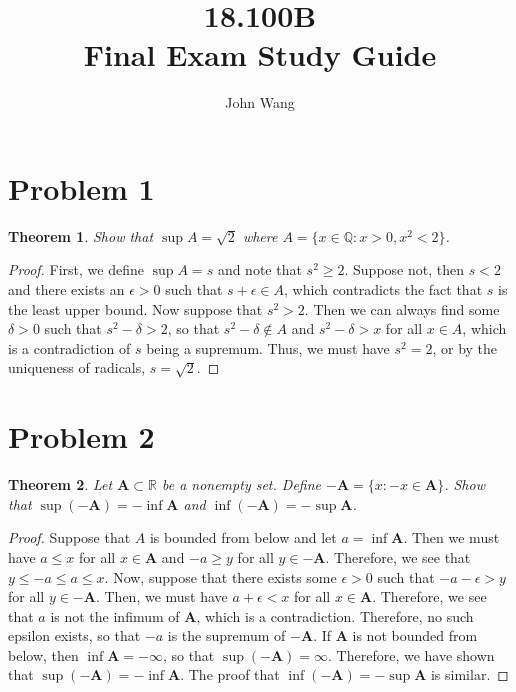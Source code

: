 \documentclass[psamsfonts]{amsart}
\title{18.100B \\
Final Exam Study Guide }
\author{John Wang}
\newtheorem{thm}{Theorem}[section]
\theoremstyle{definition}
\theoremstyle{remark}
\numberwithin{equation}{section}
\begin{document}
\maketitle

\section{Problem 1}

\begin{thm}
Show that $\sup A = \sqrt{2}$ where $A = \{ x \in \mathbb{Q}: x > 0, x^2 < 2 \}$. 
\end{thm}

\begin{proof}
First, we define $\sup A = s$ and note that $s^2 \geq 2$. Suppose not, then $s < 2$ and there exists an $\epsilon > 0$ such that $s + \epsilon \in A$, which contradicts the fact that $s$ is the least upper bound. Now suppose that $s^2 > 2$. Then we can always find some $\delta > 0$ such that $ s^2 - \delta > 2$, so that $s^2 - \delta \notin A$ and $s^2 - \delta > x$ for all $x \in A$, which is a contradiction of $s$ being a supremum. Thus, we must have $s^2 = 2$, or by the uniqueness of radicals, $s = \sqrt{2}$. 
\end{proof}

\section{Problem 2}

\begin{thm}
Let $\mathbf{A} \subset \mathbb{R}$ be a nonempty set. Define $ - \mathbf{A} = \{ x: -x \in \mathbf{A} \}$. Show that $\sup( -\mathbf{A}) = - \inf \mathbf{A}$ and $\inf( - \mathbf{A}) = - \sup \mathbf{A}$.
\end{thm}

\begin{proof}
Suppose that $A$ is bounded from below and let $a = \inf \mathbf{A}$. Then we must have $a \leq x$ for all $x \in \mathbf{A}$ and $-a \geq y$ for all $y \in -\mathbf{A}$. Therefore, we see that $y \leq -a \leq a \leq x$. Now, suppose that there exists some $\epsilon > 0$ such that $-a - \epsilon > y$ for all $y \in -\mathbf{A}$. Then, we must have $a + \epsilon < x$ for all $x \in \mathbf{A}$. Therefore, we see that $a$ is not the infimum of $\mathbf{A}$, which is a contradiction. Therefore, no such epsilon exists, so that $-a$ is the supremum of $-\mathbf{A}$. If $\mathbf{A}$ is not bounded from below, then $\inf \mathbf{A} = - \infty$, so that $\sup ( -\mathbf{A}) = \infty$. Therefore, we have shown that $\sup( - \mathbf{A}) = - \inf \mathbf{A}$. The proof that $\inf(-\mathbf{A}) = - \sup \mathbf{A}$ is similar. 
\end{proof}
\end{document}
